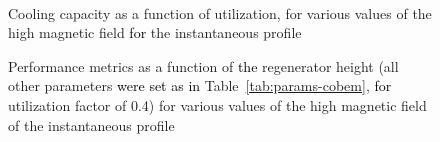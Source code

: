 \documentclass[referee]{svjour3}
\begin{document}
\begin{figure}[!ht]
  \centering
{}
\,
  \caption{Cooling capacity as a function of utilization, for various values of the high magnetic field  \textcolor{black}{for} the instantaneous profile}
  \label{fig:qc_phi_inst}
\end{figure}

\begin{figure}[!ht]
  \centering
\quad
  \caption{Performance metrics as a function of \textcolor{black}{the} regenerator height (all other parameters \textcolor{black}{were set as in} Table~\ref{tab:params-cobem}, \textcolor{black}{for}  utilization factor of 0.4) for various values of the high magnetic field of the instantaneous profile}
\label{fig:Qc_H_inst}
\end{figure}
\end{document}
